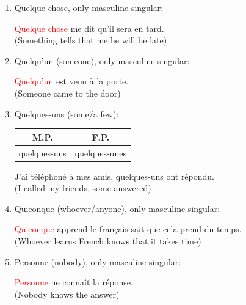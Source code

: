 \documentclass{book}
\begin{document}
\begin{enumerate}
            \item Quelque chose, only masculine singular:
                \begin{center}
                    \textcolor{red}{Quelque chose} me dit qu'il sera en tard. \\
                    (Something tells that me he will be late)
                \end{center}

            \item Quelqu'un (someone), only masculine singular:
                \begin{center}
                    \textcolor{red}{Quelqu'un} est venu à la porte. \\
                    (Someone came to the door)
                \end{center}
            \item Quelques-uns (some/a few):
                \begin{center}
                    \begin{tabular}{|c|c|}
                        \hline
                        \textbf{M.P.} & \textbf{F.P.} \\
                        \hline
                        quelques-uns & quelques-unes \\
                        \hline
                    \end{tabular}
                \end{center}
                \begin{center}
                    J'ai téléphoné à mes amis, quelques-uns ont répondu. \\
                    (I called my friends, some answered)
                \end{center}
            \item Quiconque (whoever/anyone), only masculine singular:
                \begin{center}
                    \textcolor{red}{Quiconque} apprend le français sait que cela prend du temps. \\
                    (Whoever learns French knows that it takes time)
                \end{center}
            \item Personne (nobody), only masculine singular:
                \begin{center}
                    \textcolor{red}{Personne} ne connaît la réponse. \\
                    (Nobody knows the answer)

\end{center}
\end{enumerate}
\end{document}
